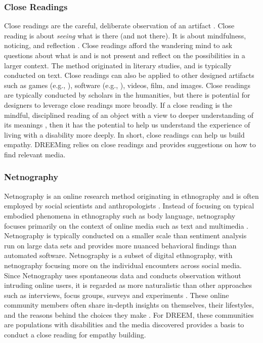 \subsubsection{Close Readings\label{CloseReadings}}
Close readings are the careful, deliberate observation of an artifact \cite{brummettTechniquesCloseReading2019}. Close reading is about \textit{seeing} what is there (and not there). It is about mindfulness, noticing, and reflection \cite{brummettTechniquesCloseReading2019}. Close readings afford the wandering mind to ask questions about what is and is not present and reflect on the possibilities in a larger context. The method originated in literary studies, and is typically conducted on text. Close readings can also be applied to other designed artifacts such as games (e.g., \cite{wardrip-fruinHowPacManEats2020}), software (e.g., \cite{sackSoftwareArts2019}), videos, film, and images. Close readings are typically conducted by scholars in the humanities, but there is potential for designers to leverage close readings more broadly. If a close reading is the mindful, disciplined reading of an object with a view to deeper understanding of its meanings \cite{brummettTechniquesCloseReading2019}, then it has the potential to help us understand the experience of living with a disability more deeply. In short, close readings can help us build empathy. DREEMing relies on close readings and provides suggestions on how to find relevant media.

\subsubsection{Netnography}
Netnography is an online research method originating in ethnography and is often employed by social scientists and anthropologists \cite{kozinetsNetnographyEssentialGuide2019}. Instead of focusing on typical embodied phenomena in ethnography such as body language, netnography focuses primarily on the context of online media such as text and multimedia \cite{bartlReviewAnalysisLiterature2016}. Netnography is typically conducted on a smaller scale than sentiment analysis run on large data sets and provides more nuanced behavioral findings than automated software. Netnography is a subset of digital ethnography, with netnography focusing more on the individual encounters across social media.  Since Netnography uses spontaneous data and conducts observation without intruding online users, it is regarded as more naturalistic than other approaches such as interviews, focus groups, surveys and experiments \cite{kozinetsNetnographyRedefined2015}. These online community members often share in-depth insights on themselves, their lifestyles, and the reasons behind the choices they make \cite{kozinetsNetnographyEssentialGuide2019}.  For DREEM, these communities are populations with disabilities and the media discovered provides a basis to conduct a close reading for empathy building.

